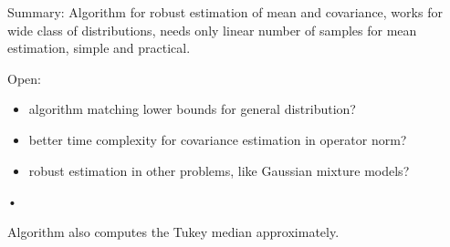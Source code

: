 Summary: 
Algorithm for robust estimation of mean and covariance, works for wide class of distributions, needs only linear number of samples for mean estimation, simple and practical.

Open:
\begin{itemize}
\item
algorithm matching lower bounds for general distribution?
\item
better time complexity for covariance estimation in operator norm?
\item
robust estimation in other problems, like Gaussian mixture models?
\end{itemize}•

Algorithm also computes the Tukey median approximately.